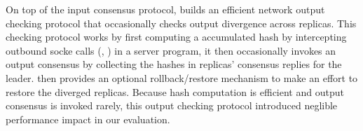 On top of the input consensus protocol, \xxx builds an efficient network output 
checking protocol that occasionally checks output divergence across replicas. 
This checking protocol works by first computing a accumulated hash by 
intercepting outbound socke calls (\eg, \send) in a server program, it then 
occasionally invokes an output consensus by collecting the hashes in replicas' 
consensus replies for the leader. \xxx then provides an optional 
rollback/restore mechanism to make an effort to restore the diverged replicas. 
Because hash computation is efficient and output consensus is invoked rarely, 
this output checking protocol introduced neglible performance impact in our 
evaluation.


% 







